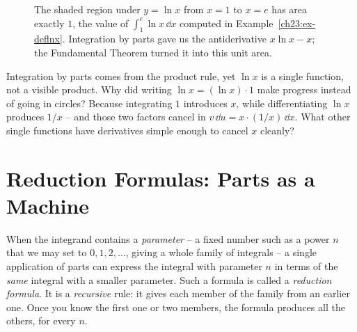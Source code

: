 \begin{figure}[H]
\centering
{}
\caption{The shaded region under $y=\ln x$ from $x=1$ to $x=e$ has area exactly
$1$, the value of $\int_1^e \ln x\,\dd x$ computed in
Example~\ref{ch23:ex-deflnx}. Integration by parts gave us the antiderivative
$x\ln x - x$; the Fundamental Theorem turned it into this unit area.}
\label{ch23:fig-lnarea}
\end{figure}

\begin{walkbox}
Integration by parts comes from the
product rule, yet $\ln x$ is a single function, not a visible product. Why did
writing $\ln x = (\ln x)\cdot 1$ make progress instead of going in circles?
Because integrating $1$ introduces $x$, while differentiating $\ln x$ produces
$1/x$ -- and those two factors cancel in $v\,\dd u = x\cdot(1/x)\,\dd x$. What
other single functions have derivatives simple enough to cancel $x$ cleanly?
\end{walkbox}

\section{Reduction Formulas: Parts as a Machine}
\label{ch23:reduction}

When the integrand contains a \emph{parameter} -- a fixed number such as a power
$n$ that we may set to $0, 1, 2, \dots$, giving a whole family of integrals -- a single
application of parts can express the integral with parameter $n$ in terms of the
\emph{same} integral with a smaller parameter. Such a formula is called a
\emph{reduction formula}. It is a \emph{recursive} rule: it gives each member of
the family from an earlier one. Once you know the first one or two members, the
formula produces all the others, for every $n$.

